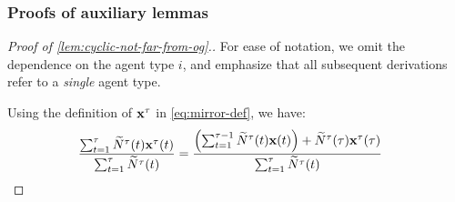 \documentclass[12pt]{article}
\begin{document}
\subsubsection{Proofs of auxiliary lemmas}\label{apx:aux-lemmas-static-is-opt}

\begin{proof}[Proof of \cref{lem:cyclic-not-far-from-og}.]
For ease of notation, we omit the dependence on the agent type $i$, and emphasize that all subsequent derivations refer to a {\it single} agent type.

Using the definition of $\mathbf{x}^\tau$ in \eqref{eq:mirror-def}, we have:
\begin{align}\label{eq:cyclic-ratio}
    \frac{\sum_{t=1}^\tau \widetilde{N}^\tau(t)\mathbf{x}^\tau(t)}{\sum_{t=1}^\tau\widetilde{N}^\tau(t)}  &= \frac{\left(\sum_{t=1}^{\tau-1} \widetilde{N}^\tau(t)\mathbf{x}(t)\right) + \widetilde{N}^\tau(\tau) \mathbf{x}^\tau(\tau)}{\sum_{t=1}^\tau\widetilde{N}^\tau(t)} 
\end{align}


\end{proof}
\end{document}
